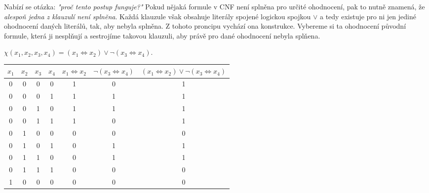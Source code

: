 Nabízí se otázka: \emph{"proč tento postup funguje?"} Pokud nějaká formule v CNF není splněna pro určité ohodnocení, pak to nutně znamená, že \emph{alespoň jedna z klauzulí není splněna}. Každá klauzule však obsahuje literály spojené logickou spojkou $\lor$ a tedy existuje pro ni jen jediné ohodnocení daných literálů, tak, aby nebyla splněna. Z tohoto proncipu vychází ona konstrukce. Vybereme si ta ohodnocení původní formule, která ji nesplňují a sestrojíme takovou klauzuli, aby právě pro dané ohodnocení nebyla splňena.
\begin{example}
    \(\chi(x_1,x_2,x_3,x_4)=(x_1\iff x_2)\lor \neg(x_3\iff x_4)\).
    \begin{table}[h]
        \centering
        \begin{tabular}{|c|c|c|c|c|c|c|}
        \hline
        $x_1$ & $x_2$ & $x_3$ & $x_4$ & $x_1\iff x_2$ & $\neg(x_3\iff x_4)$ & $(x_1\iff x_2)\lor\neg(x_3\iff x_4)$ \\ \hline
        0     & 0     & 0     & 0     & 1             & 0                                                 & 1                                    \\ \hline
        0     & 0     & 0     & 1     & 1             & 1                                                 & 1                                    \\ \hline
        0     & 0     & 1     & 0     & 1             & 1                                                 & 1                                    \\ \hline
        0     & 0     & 1     & 1     & 1             & 0                                                 & 1                                    \\ \hline
        0     & 1     & 0     & 0     & 0             & 0                                                 & 0                                    \\ \hline
        0     & 1     & 0     & 1     & 0             & 1                                                 & 1                                    \\ \hline
        0     & 1     & 1     & 0     & 0             & 1                                                 & 1                                    \\ \hline
        0     & 1     & 1     & 1     & 0             & 0                                                 & 0                                    \\ \hline
        1     & 0     & 0     & 0     & 0             & 0                                                 & 0                                    \\ \hline

\end{tabular}
\end{table}
\end{example}
